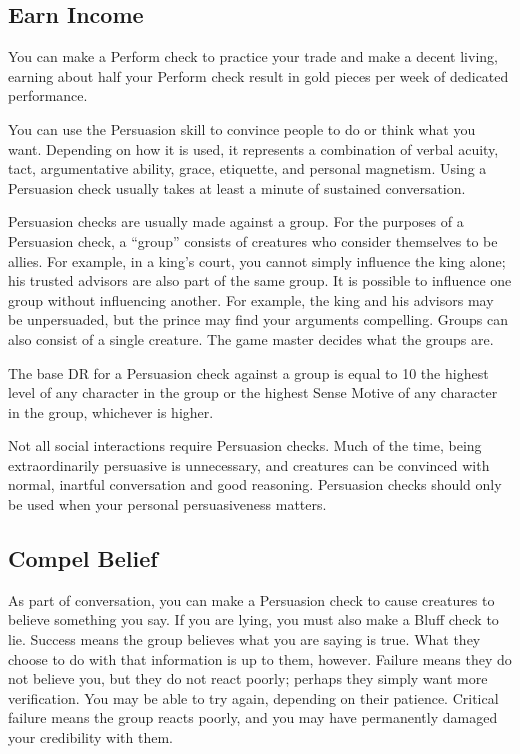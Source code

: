    \subsection{Earn Income}
        You can make a Perform check to practice your trade and make a decent living, earning about half your Perform check result in gold pieces per week of dedicated performance.

        You can use the Persuasion skill to convince people to do or think what you want. Depending on how it is used, it represents a combination of verbal acuity, tact, argumentative ability, grace, etiquette, and personal magnetism. Using a Persuasion check usually takes at least a minute of sustained conversation.

        Persuasion checks are usually made against a group. For the purposes of a Persuasion check, a ``group'' consists of creatures who consider themselves to be allies. For example, in a king's court, you cannot simply influence the king alone; his trusted advisors are also part of the same group. It is possible to influence one group without influencing another. For example, the king and his advisors may be unpersuaded, but the prince may find your arguments compelling. Groups can also consist of a single creature. The game master decides what the groups are.

        The base DR for a Persuasion check against a group is equal to 10 \add the highest level of any character in the group or the highest Sense Motive of any character in the group, whichever is higher.

        Not all social interactions require Persuasion checks. Much of the time, being extraordinarily persuasive is unnecessary, and creatures can be convinced with normal, inartful conversation and good reasoning. Persuasion checks should only be used when your personal persuasiveness matters.

    \subsection{Compel Belief}\label{Compel Belief}
        As part of conversation, you can make a Persuasion check to cause creatures to believe something you say. If you are lying, you must also make a Bluff check to lie. Success means the group believes what you are saying is true. What they choose to do with that information is up to them, however. Failure means they do not believe you, but they do not react poorly; perhaps they simply want more verification. You may be able to try again, depending on their patience. Critical failure means the group reacts poorly, and you may have permanently damaged your credibility with them.

